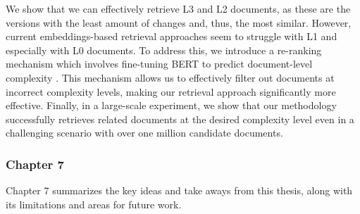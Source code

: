 \documentclass[thesis.tex]{subfiles}
\begin{document}
We show that we can effectively retrieve L3 and L2 documents, as these are the versions with the least amount of changes and, thus, the most similar. However, current embeddings-based retrieval approaches seem to struggle with L1 and especially with L0 documents. To address this, we introduce a re-ranking mechanism which involves fine-tuning BERT to predict document-level complexity \citep{devlin2019bert}. This mechanism allows us to effectively filter out documents at incorrect complexity levels, making our retrieval approach significantly more effective. Finally, in a large-scale experiment, we show that our methodology successfully retrieves related documents at the desired complexity level even in a challenging scenario with over one million candidate documents.

\subsubsection{Chapter 7}

Chapter 7 summarizes the key ideas and take aways from this thesis, along with its limitations and areas for future work.


\biblio
\end{document}
